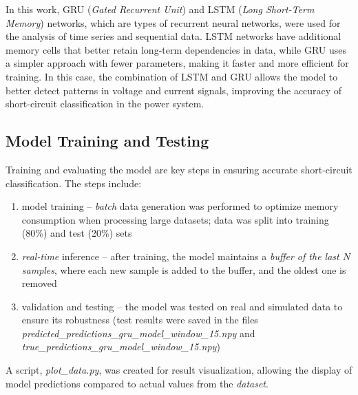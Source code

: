\documentclass[11pt]{IEEEtran}
\begin{document}
In this work, GRU (\textit{Gated Recurrent Unit}) and LSTM (\textit{Long Short-Term Memory}) networks, which are types of recurrent neural networks, were used for the analysis of time series and sequential data. LSTM networks have additional memory cells that better retain long-term dependencies in data, while GRU uses a simpler approach with fewer parameters, making it faster and more efficient for training. In this case, the combination of LSTM and GRU allows the model to better detect patterns in voltage and current signals, improving the accuracy of short-circuit classification in the power system.



\subsection{Model Training and Testing}

Training and evaluating the model are key steps in ensuring accurate short-circuit classification. The steps include:

\begin{enumerate}
    \item model training – \textit{batch} data generation was performed to optimize memory consumption when processing large datasets; data was split into training (80\%) and test (20\%) sets

    \item \textit{real-time} inference – after training, the model maintains a \textit{buffer of the last \(N\) samples}, where each new sample is added to the buffer, and the oldest one is removed
    
    \item validation and testing – the model was tested on real and simulated data to ensure its robustness (test results were saved in the files \textit{predicted\_predictions\_gru\_model\_window\_15.npy} and \textit{true\_predictions\_gru\_model\_window\_15.npy})
\end{enumerate}
A script, \textit{plot\_data.py}, was created for result visualization, allowing the display of model predictions compared to actual values from the \textit{dataset}.
\end{document}
